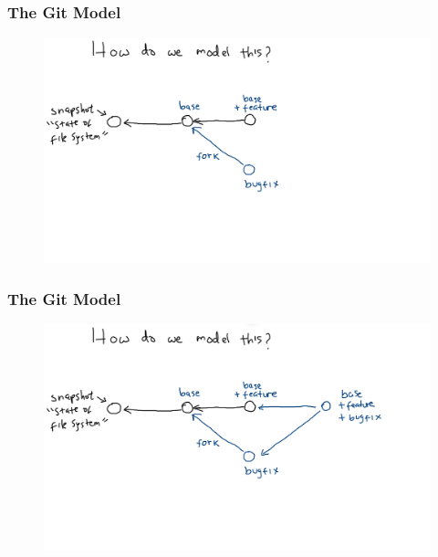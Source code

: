 \documentclass[11pt]{beamer}
\begin{document}
\begin{frame}[fragile]
\frametitle{The Git Model}

\begin{figure}[htp]
 \centering
 \includegraphics[scale=0.2]{git_model_2b.png}
\end{figure}

\end{frame}



\begin{frame}[fragile]
\frametitle{The Git Model}

\begin{figure}[htp]
 \centering
 \includegraphics[scale=0.2]{git_model_2c.png}
\end{figure}

\end{frame}


\end{document}
